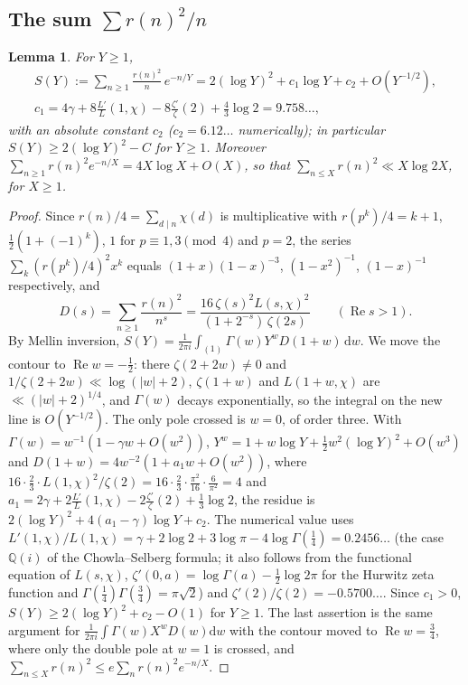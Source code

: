 ﻿\documentclass[11pt]{amsart}
\newtheorem{lemma}[theorem]{Lemma}
\theoremstyle{remark}
\newcommand{\dd}{\mathrm{d}}
\begin{document}
\subsection{The sum $\sum r(n)^2/n$}
\begin{lemma}\label{lem:r2}
For $Y\ge1$,
\begin{gather*}
S(Y):=\sum_{n\ge1}\frac{r(n)^2}{n}\,e^{-n/Y}=2(\log Y)^2+c_1\log Y+c_2+O(Y^{-1/2}),\\
c_1=4\gamma+8\frac{L'}{L}(1,\chi)-8\frac{\zeta'}{\zeta}(2)+\frac43\log2=9.758\ldots,
\end{gather*}
with an absolute constant $c_2$ ($c_2=6.12\ldots$ numerically); in particular $S(Y)\ge2(\log Y)^2-C$ for $Y\ge1$. Moreover $\sum_{n\ge1}r(n)^2e^{-n/X}=4X\log X+O(X)$, so that $\sum_{n\le X}r(n)^2\ll X\log 2X$, for $X\ge1$.
\end{lemma}
\begin{proof}
Since $r(n)/4=\sum_{d\mid n}\chi(d)$ is multiplicative with $r(p^k)/4=k+1$, $\frac12(1+(-1)^k)$, $1$ for $p\equiv1,3\pmod4$ and $p=2$, the series $\sum_k(r(p^k)/4)^2x^k$ equals $(1+x)(1-x)^{-3}$, $(1-x^2)^{-1}$, $(1-x)^{-1}$ respectively, and
\[
D(s)=\sum_{n\ge1}\frac{r(n)^2}{n^s}=\frac{16\,\zeta(s)^2L(s,\chi)^2}{(1+2^{-s})\,\zeta(2s)}\qquad(\operatorname{Re}s>1).
\]
By Mellin inversion, $S(Y)=\frac1{2\pi i}\int_{(1)}\Gamma(w)Y^wD(1+w)\,\dd w$. We move the contour to $\operatorname{Re}w=-\frac12$: there $\zeta(2+2w)\ne0$ and $1/\zeta(2+2w)\ll\log(|w|+2)$, $\zeta(1+w)$ and $L(1+w,\chi)$ are $\ll(|w|+2)^{1/4}$, and $\Gamma(w)$ decays exponentially, so the integral on the new line is $O(Y^{-1/2})$. The only pole crossed is $w=0$, of order three. With $\Gamma(w)=w^{-1}(1-\gamma w+O(w^2))$, $Y^w=1+w\log Y+\frac12w^2(\log Y)^2+O(w^3)$ and $D(1+w)=4w^{-2}(1+a_1w+O(w^2))$, where $16\cdot\frac23\cdot L(1,\chi)^2/\zeta(2)=16\cdot\frac23\cdot\frac{\pi^2}{16}\cdot\frac6{\pi^2}=4$ and $a_1=2\gamma+2\frac{L'}{L}(1,\chi)-2\frac{\zeta'}{\zeta}(2)+\frac13\log2$, the residue is $2(\log Y)^2+4(a_1-\gamma)\log Y+c_2$. The numerical value uses $L'(1,\chi)/L(1,\chi)=\gamma+2\log2+3\log\pi-4\log\Gamma(\frac14)=0.2456\ldots$ (the case $\mathbb Q(i)$ of the Chowla--Selberg formula; it also follows from the functional equation of $L(s,\chi)$, $\zeta'(0,a)=\log\Gamma(a)-\frac12\log2\pi$ for the Hurwitz zeta function and $\Gamma(\frac14)\Gamma(\frac34)=\pi\sqrt2$) and $\zeta'(2)/\zeta(2)=-0.5700\ldots$. Since $c_1>0$, $S(Y)\ge2(\log Y)^2+c_2-O(1)$ for $Y\ge1$. The last assertion is the same argument for $\frac1{2\pi i}\int\Gamma(w)X^wD(w)\dd w$ with the contour moved to $\operatorname{Re}w=\frac34$, where only the double pole at $w=1$ is crossed, and $\sum_{n\le X}r(n)^2\le e\sum_nr(n)^2e^{-n/X}$.
\end{proof}
\end{document}
